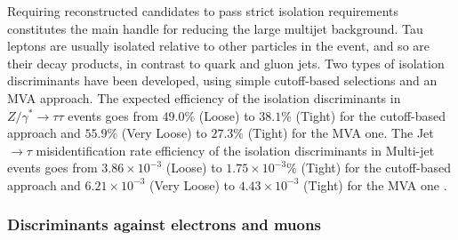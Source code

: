 Requiring reconstructed \hadtau candidates to pass strict isolation requirements constitutes the main handle for reducing the large multijet background. Tau leptons are usually isolated relative to other particles in the event, and so are their decay products, in contrast to quark and gluon jets. Two types of \hadtau isolation discriminants have been developed, using simple cutoff-based selections and an MVA approach. The expected efficiency of the \hadtau isolation discriminants in \ensuremath{Z/\gamma^{*} \longrightarrow \tau\tau} events goes from \ensuremath{49.0\%} (Loose) to \ensuremath{38.1}\% (Tight) for the cutoff-based approach and \ensuremath{55.9\%} (Very Loose) to \ensuremath{27.3\%} (Tight) for the MVA one. The Jet \ensuremath{\to \tau} misidentification rate efficiency of the \hadtau isolation discriminants in Multi-jet events goes from \ensuremath{3.86 \times 10^{−3}} (Loose) to \ensuremath{1.75 \times 10^{−3}}\% (Tight) for the cutoff-based approach and \ensuremath{6.21 \times 10^{−3}} (Very Loose) to \ensuremath{4.43 \times 10^{−3}} (Tight) for the MVA one \cite{Khachatryan:2015dfa}.
 
\subsubsection{Discriminants against electrons and muons}


